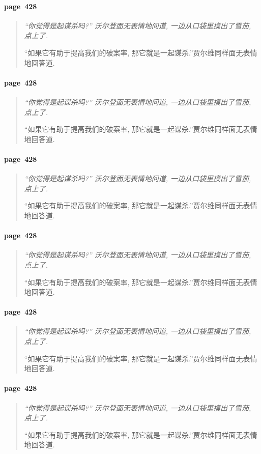 \paragraph*{page~428}
\begin{quotation}
    \itshape
    ``你觉得是起谋杀吗?'' 沃尔登面无表情地问道, 一边从口袋里摸出了雪茄, 点上了. 

    ``如果它有助于提高我们的破案率, 那它就是一起谋杀.''贾尔维同样面无表情地回答道. 
\end{quotation}

\paragraph*{page~428}
\begin{quotation}
    \itshape
    ``你觉得是起谋杀吗?'' 沃尔登面无表情地问道, 一边从口袋里摸出了雪茄, 点上了. 

    ``如果它有助于提高我们的破案率, 那它就是一起谋杀.''贾尔维同样面无表情地回答道. 
\end{quotation}

\paragraph*{page~428}
\begin{quotation}
    \itshape
    ``你觉得是起谋杀吗?'' 沃尔登面无表情地问道, 一边从口袋里摸出了雪茄, 点上了. 

    ``如果它有助于提高我们的破案率, 那它就是一起谋杀.''贾尔维同样面无表情地回答道. 
\end{quotation}

\paragraph*{page~428}
\begin{quotation}
    \itshape
    ``你觉得是起谋杀吗?'' 沃尔登面无表情地问道, 一边从口袋里摸出了雪茄, 点上了. 

    ``如果它有助于提高我们的破案率, 那它就是一起谋杀.''贾尔维同样面无表情地回答道. 
\end{quotation}

\paragraph*{page~428}
\begin{quotation}
    \itshape
    ``你觉得是起谋杀吗?'' 沃尔登面无表情地问道, 一边从口袋里摸出了雪茄, 点上了. 

    ``如果它有助于提高我们的破案率, 那它就是一起谋杀.''贾尔维同样面无表情地回答道. 
\end{quotation}

\paragraph*{page~428}
\begin{quotation}
    \itshape
    ``你觉得是起谋杀吗?'' 沃尔登面无表情地问道, 一边从口袋里摸出了雪茄, 点上了. 

    ``如果它有助于提高我们的破案率, 那它就是一起谋杀.''贾尔维同样面无表情地回答道. 
\end{quotation}
